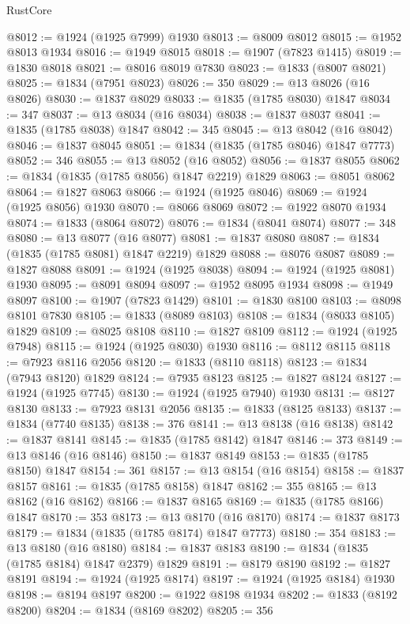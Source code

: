 \begin{lexlean}{RustCore}
\begin{coremodule}
@8012 := @1924 (@1925 @7999) @1930
@8013 := @8009 @8012
@8015 := @1952 @8013 @1934
@8016 := @1949 @8015
@8018 := @1907 (@7823 @1415)
@8019 := @1830 @8018
@8021 := @8016 @8019 @7830
@8023 := @1833 (@8007 @8021)
@8025 := @1834 (@7951 @8023)
@8026 := 350
@8029 := @13 @8026 (@16 @8026)
@8030 := @1837 @8029
@8033 := @1835 (@1785 @8030) @1847
@8034 := 347
@8037 := @13 @8034 (@16 @8034)
@8038 := @1837 @8037
@8041 := @1835 (@1785 @8038) @1847
@8042 := 345
@8045 := @13 @8042 (@16 @8042)
@8046 := @1837 @8045
@8051 := @1834 (@1835 (@1785 @8046) @1847 @7773)
@8052 := 346
@8055 := @13 @8052 (@16 @8052)
@8056 := @1837 @8055
@8062 := @1834 (@1835 (@1785 @8056) @1847 @2219) @1829
@8063 := @8051 @8062
@8064 := @1827 @8063
@8066 := @1924 (@1925 @8046)
@8069 := @1924 (@1925 @8056) @1930
@8070 := @8066 @8069
@8072 := @1922 @8070 @1934
@8074 := @1833 (@8064 @8072)
@8076 := @1834 (@8041 @8074)
@8077 := 348
@8080 := @13 @8077 (@16 @8077)
@8081 := @1837 @8080
@8087 := @1834 (@1835 (@1785 @8081) @1847 @2219) @1829
@8088 := @8076 @8087
@8089 := @1827 @8088
@8091 := @1924 (@1925 @8038)
@8094 := @1924 (@1925 @8081) @1930
@8095 := @8091 @8094
@8097 := @1952 @8095 @1934
@8098 := @1949 @8097
@8100 := @1907 (@7823 @1429)
@8101 := @1830 @8100
@8103 := @8098 @8101 @7830
@8105 := @1833 (@8089 @8103)
@8108 := @1834 (@8033 @8105) @1829
@8109 := @8025 @8108
@8110 := @1827 @8109
@8112 := @1924 (@1925 @7948)
@8115 := @1924 (@1925 @8030) @1930
@8116 := @8112 @8115
@8118 := @7923 @8116 @2056
@8120 := @1833 (@8110 @8118)
@8123 := @1834 (@7943 @8120) @1829
@8124 := @7935 @8123
@8125 := @1827 @8124
@8127 := @1924 (@1925 @7745)
@8130 := @1924 (@1925 @7940) @1930
@8131 := @8127 @8130
@8133 := @7923 @8131 @2056
@8135 := @1833 (@8125 @8133)
@8137 := @1834 (@7740 @8135)
@8138 := 376
@8141 := @13 @8138 (@16 @8138)
@8142 := @1837 @8141
@8145 := @1835 (@1785 @8142) @1847
@8146 := 373
@8149 := @13 @8146 (@16 @8146)
@8150 := @1837 @8149
@8153 := @1835 (@1785 @8150) @1847
@8154 := 361
@8157 := @13 @8154 (@16 @8154)
@8158 := @1837 @8157
@8161 := @1835 (@1785 @8158) @1847
@8162 := 355
@8165 := @13 @8162 (@16 @8162)
@8166 := @1837 @8165
@8169 := @1835 (@1785 @8166) @1847
@8170 := 353
@8173 := @13 @8170 (@16 @8170)
@8174 := @1837 @8173
@8179 := @1834 (@1835 (@1785 @8174) @1847 @7773)
@8180 := 354
@8183 := @13 @8180 (@16 @8180)
@8184 := @1837 @8183
@8190 := @1834 (@1835 (@1785 @8184) @1847 @2379) @1829
@8191 := @8179 @8190
@8192 := @1827 @8191
@8194 := @1924 (@1925 @8174)
@8197 := @1924 (@1925 @8184) @1930
@8198 := @8194 @8197
@8200 := @1922 @8198 @1934
@8202 := @1833 (@8192 @8200)
@8204 := @1834 (@8169 @8202)
@8205 := 356

\end{coremodule}
\end{lexlean}

